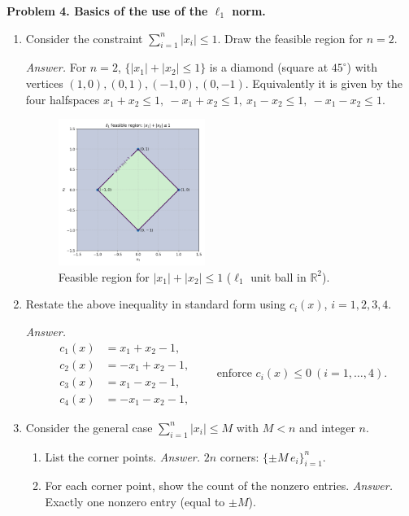 \documentclass[11pt]{article}
\begin{document}
\newpage
	
\textbf{Problem 4. Basics of the use of the $\ell_1$ norm.}

\begin{enumerate}[label=4(\alph*)]
	
	\item Consider the constraint $\sum_{i=1}^{n}|x_i|\le 1$. Draw the feasible region for $n=2$.
	
	\emph{Answer.}
	For $n=2$, $\{|x_1|+|x_2|\le 1\}$ is a diamond (square at $45^\circ$) with vertices $(1,0),(0,1),(-1,0),(0,-1)$.
	Equivalently it is given by the four halfspaces
	$x_1+x_2\le 1,\ -x_1+x_2\le 1,\ x_1-x_2\le 1,\ -x_1-x_2\le 1$.
	\begin{figure}[H]\centering
		\includegraphics[width=0.45\textwidth]{4a.png}
		\caption{Feasible region for $|x_1|+|x_2|\le 1$ ($\ell_1$ unit ball in $\mathbb{R}^2$).}
	\end{figure}
	
	\item Restate the above inequality in standard form using $c_i(x)$, $i=1,2,3,4$.
	
	\emph{Answer.}
	\[
	\boxed{
		\begin{aligned}
			c_1(x)&=x_1+x_2-1,\\
			c_2(x)&=-x_1+x_2-1,\\
			c_3(x)&=x_1-x_2-1,\\
			c_4(x)&=-x_1-x_2-1,
	\end{aligned}}
	\qquad\text{enforce } c_i(x)\le 0\ (i=1,\dots,4).
	\]
	
	\item Consider the general case $\sum_{i=1}^{n}|x_i|\le M$ with $M<n$ and integer $n$.
	\begin{enumerate}[label=\roman*)]
		\item List the corner points. \quad
		\emph{Answer.} $2n$ corners: $\{\pm M\,e_i\}_{i=1}^n$.
		\item For each corner point, show the count of the nonzero entries. \quad
		\emph{Answer.} Exactly one nonzero entry (equal to $\pm M$).
	\end{enumerate}
	

\end{enumerate}
\end{document}
